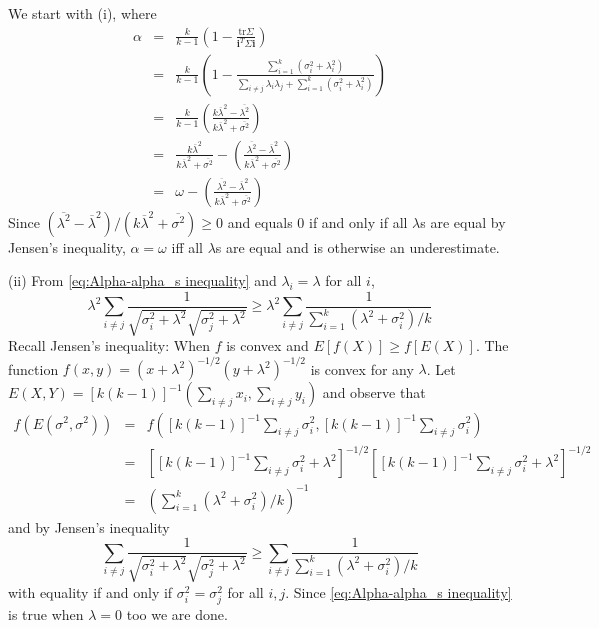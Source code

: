 \documentclass{article}
\makeatletter
\theoremstyle{plain}
\theoremstyle{plain}
\theoremstyle{definition}
\theoremstyle{remark}
\theoremstyle{definition}
\theoremstyle{plain}
\theoremstyle{plain}
\theoremstyle{definition}
\newenvironment{proof}[1][\protect\proofname]{\par
	\normalfont\topsep6\p@\@plus6\p@\relax
	\trivlist
	\itemindent\parindent
	\item[\hskip\labelsep\scshape #1]\ignorespaces
}{%
	\endtrivlist\@endpefalse
}
\providecommand{\proofname}{Proof}
\makeatother
\begin{document}
\begin{proof}[Proof of Proposition \ref{prop:Reliabilities.}]\label{proof:Reliabilities.}
We start with (i), where
\begin{eqnarray*}
\alpha & = & \frac{k}{k-1}\left(1-\frac{\textrm{tr}\Sigma}{\mathbf{i}^{T}\Sigma\mathbf{i}}\right)\\
 & = & \frac{k}{k-1}\left(1-\frac{\sum_{i=1}^{k}\left(\sigma_{i}^{2}+\lambda_{i}^{2}\right)}{\sum_{i\neq j}\lambda_{i}\lambda_{j}+\sum_{i=1}^{k}\left(\sigma_{i}^{2}+\lambda_{i}^{2}\right)}\right)\\
 & = & \frac{k}{k-1}\left(\frac{k\overline{\lambda}^{2}-\overline{\lambda^{2}}}{k\overline{\lambda}^{2}+\overline{\sigma^{2}}}\right)\\
 & = & \frac{k\overline{\lambda}^{2}}{k\overline{\lambda}^{2}+\overline{\sigma^{2}}}-\left(\frac{\overline{\lambda^{2}}-\overline{\lambda}^{2}}{k\overline{\lambda}^{2}+\overline{\sigma^{2}}}\right)\\
 & = & \omega-\left(\frac{\overline{\lambda^{2}}-\overline{\lambda}^{2}}{k\overline{\lambda}^{2}+\overline{\sigma^{2}}}\right)
\end{eqnarray*}
Since $(\overline{\lambda^{2}}-\overline{\lambda}^{2})/(k\overline{\lambda}^{2}+\overline{\sigma^{2}})\geq0$
and equals $0$ if and only if all $\lambda$s are equal by Jensen's inequality, $\alpha=\omega$
iff all $\lambda$s are equal and is otherwise an underestimate.

(ii) From \eqref{eq:Alpha-alpha_s inequality} and $\lambda_{i}=\lambda$
for all $i$,
\[
\lambda^{2}\sum_{i\neq j}\frac{1}{\sqrt{\sigma_{i}^{2}+\lambda^{2}}\sqrt{\sigma_{j}^{2}+\lambda^{2}}}\geq\lambda^{2}\sum_{i\neq j}\frac{1}{\sum_{i=1}^{k}\left(\lambda^{2}+\sigma_{i}^{2}\right)/k}
\]
Recall Jensen's inequality: When $f$ is convex and $E\left[f\left(X\right)\right]\geq f\left[E\left(X\right)\right]$.
The function $f\left(x,y\right)=\left(x+\lambda^{2}\right)^{-1/2}\left(y+\lambda^{2}\right)^{-1/2}$
is convex for any $\lambda$. Let $E\left(X,Y\right)=\left[k\left(k-1\right)\right]^{-1}\left(\sum_{i\neq j}x_{i},\sum_{i\neq j}y_{i}\right)$
and observe that
\begin{eqnarray*}
f\left(E\left(\sigma^{2},\sigma^{2}\right)\right) & = & f\left(\left[k\left(k-1\right)\right]^{-1}\sum_{i\neq j}\sigma_{i}^{2},\left[k\left(k-1\right)\right]^{-1}\sum_{i\neq j}\sigma_{i}^{2}\right)\\
 & = & \left[\left[k\left(k-1\right)\right]^{-1}\sum_{i\neq j}\sigma_{i}^{2}+\lambda^{2}\right]^{-1/2}\left[\left[k\left(k-1\right)\right]^{-1}\sum_{i\neq j}\sigma_{i}^{2}+\lambda^{2}\right]^{-1/2}\\
 & = & \left(\sum_{i=1}^{k}\left(\lambda^{2}+\sigma_{i}^{2}\right)/k\right)^{-1}
\end{eqnarray*}
and by Jensen's inequality
\[
\sum_{i\neq j}\frac{1}{\sqrt{\sigma_{i}^{2}+\lambda^{2}}\sqrt{\sigma_{j}^{2}+\lambda^{2}}}\geq\sum_{i\neq j}\frac{1}{\sum_{i=1}^{k}\left(\lambda^{2}+\sigma_{i}^{2}\right)/k}
\]
with equality if and only if $\sigma_{i}^{2}=\sigma_{j}^{2}$ for
all $i,j$. Since \eqref{eq:Alpha-alpha_s inequality} is true when
$\lambda=0$ too we are done.


\end{proof}
\end{document}
